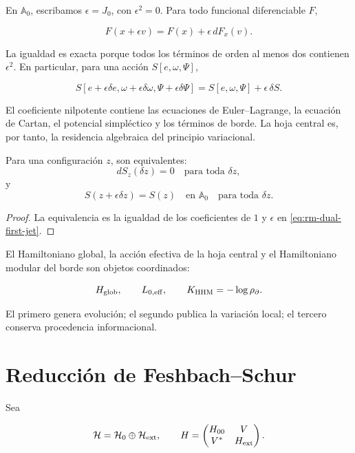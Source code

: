 En \(\mathbb A_0\), escribamos \(\epsilon=J_0\), con \(\epsilon^2=0\). Para
todo funcional diferenciable \(F\),

\begin{equation}
\boxed{F(x+\epsilon v)=F(x)+\epsilon\,dF_x(v).}
\label{eq:rm-dual-first-jet}
\end{equation}

La igualdad es exacta porque todos los t\'erminos de orden al menos dos
contienen \(\epsilon^2\). En particular, para una acci\'on
\(S[e,\omega,\Psi]\),

\begin{equation}
S[e+\epsilon\delta e,\omega+\epsilon\delta\omega,
  \Psi+\epsilon\delta\Psi]
=S[e,\omega,\Psi]+\epsilon\,\delta S.
\label{eq:rm-action-first-jet}
\end{equation}

El coeficiente nilpotente contiene las ecuaciones de Euler--Lagrange, la
ecuaci\'on de Cartan, el potencial simpl\'ectico y los t\'erminos de borde.
La hoja central es, por tanto, la residencia algebraica del principio
variacional.

\begin{theorem}
Para una configuraci\'on \(z\), son equivalentes:
\[
dS_z(\delta z)=0\quad\text{para toda }\delta z,
\]
y
\[
S(z+\epsilon\delta z)=S(z)
\quad\text{en }\mathbb A_0
\quad\text{para toda }\delta z.
\]
\end{theorem}

\begin{proof}
La equivalencia es la igualdad de los coeficientes de \(1\) y \(\epsilon\) en
\eqref{eq:rm-dual-first-jet}.
\end{proof}

El Hamiltoniano global, la acci\'on efectiva de la hoja central y el
Hamiltoniano modular del borde son objetos coordinados:

\[
H_{\rm glob},
\qquad
L_{0,\rm eff},
\qquad
K_{\rm HHM}=-\log\rho_{\partial}.
\]

El primero genera evoluci\'on; el segundo publica la variaci\'on local; el
tercero conserva procedencia informacional.

\section{Reducci\'on de Feshbach--Schur}

Sea

\[
\mathcal H=\mathcal H_0\oplus\mathcal H_{\rm ext},
\qquad
H=
\begin{pmatrix}
H_{00}&V\\ V^*&H_{\rm ext}
\end{pmatrix}.
\]

